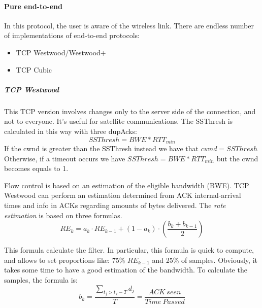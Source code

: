 \paragraph*{Pure end-to-end} In this protocol, the user is aware of the wireless
link. There are endless number of implementations of end-to-end protocols:
\begin{itemize}
\item TCP Westwood/Westwood+
\item TCP Cubic 
\end{itemize}

\subparagraph*{TCP Westwood} This TCP version involves changes only to the
server side of the connection, and not to everyone. It's useful for satellite
communications.
The SSThresh is calculated in this way with three dupAcks:
\begin{equation}
SSThresh = BWE * RTT_{min}
\end{equation}
If the cwnd is greater than the SSThresh instead we have that $cwnd=SSThresh$
Otherwise, if a timeout occurs we have $SSThresh = BWE * RTT_{min}$ but the
cwnd becomes equals to 1.

Flow control is based on an estimation of the eligible bandwidth (BWE). TCP
Westwood can perform an estimation determined from ACK internal-arrival times
and info in ACKs regarding amounts of bytes delivered. The \textit{rate
  estimation} is based on three formulas.
\begin{equation}
  RE_k = a_k \cdot RE_{k-1} + (1 - a_k) \cdot \left( \frac{b_k + b_{k-1}}{2}
\right)
\end{equation}

This formula calculate the filter. In particular, this formula is quick to
compute, and allows to set proportions like: 75\% $RE_{k-1}$ and 25\% of
samples. Obviously, it takes some time to have a good estimation of the
bandwidth.
To calculate the samples, the formula is:
\begin{equation}
b_k = \frac{ \sum_{t_j > t_k-T} d_j }{T} = \frac{ACK\ seen}{Time\ Passed}
\end{equation}

